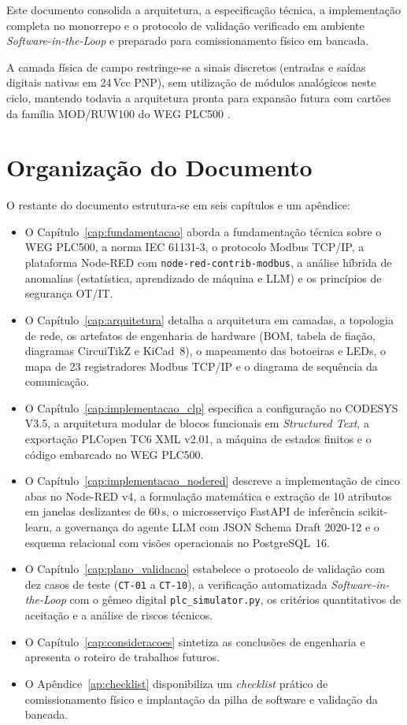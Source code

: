 Este documento consolida a arquitetura, a especificação técnica, a implementação completa no monorrepo e o protocolo de validação verificado em ambiente \textit{Software-in-the-Loop} e preparado para comissionamento físico em bancada.

A camada física de campo restringe-se a sinais discretos (entradas e saídas digitais nativas em 24\,Vcc PNP), sem utilização de módulos analógicos neste ciclo, mantendo todavia a arquitetura pronta para expansão futura com cartões da família MOD/RUW100 do WEG PLC500 \cite{weg_plc500_manual}.

\section{Organização do Documento}
\label{sec:organizacao}

O restante do documento estrutura-se em seis capítulos e um apêndice:
\begin{itemize}
  \item O Capítulo~\ref{cap:fundamentacao} aborda a fundamentação técnica sobre o WEG PLC500, a norma IEC 61131-3, o protocolo Modbus TCP/IP, a plataforma Node-RED com \texttt{node-red-contrib-modbus}, a análise híbrida de anomalias (estatística, aprendizado de máquina e LLM) e os princípios de segurança OT/IT.
  \item O Capítulo~\ref{cap:arquitetura} detalha a arquitetura em camadas, a topologia de rede, os artefatos de engenharia de hardware (BOM, tabela de fiação, diagramas CircuiTikZ e KiCad~8), o mapeamento das botoeiras e LEDs, o mapa de 23 registradores Modbus TCP/IP e o diagrama de sequência da comunicação.
  \item O Capítulo~\ref{cap:implementacao_clp} especifica a configuração no CODESYS V3.5, a arquitetura modular de blocos funcionais em \textit{Structured Text}, a exportação PLCopen TC6 XML v2.01, a máquina de estados finitos e o código embarcado no WEG PLC500.
  \item O Capítulo~\ref{cap:implementacao_nodered} descreve a implementação de cinco abas no Node-RED v4, a formulação matemática e extração de 10 atributos em janelas deslizantes de $60\,\text{s}$, o microsserviço FastAPI de inferência scikit-learn, a governança do agente LLM com JSON Schema Draft 2020-12 e o esquema relacional com visões operacionais no PostgreSQL~16.
  \item O Capítulo~\ref{cap:plano_validacao} estabelece o protocolo de validação com dez casos de teste (\texttt{CT-01} a \texttt{CT-10}), a verificação automatizada \textit{Software-in-the-Loop} com o gêmeo digital \texttt{plc\_simulator.py}, os critérios quantitativos de aceitação e a análise de riscos técnicos.
  \item O Capítulo~\ref{cap:consideracoes} sintetiza as conclusões de engenharia e apresenta o roteiro de trabalhos futuros.
  \item O Apêndice~\ref{ap:checklist} disponibiliza um \textit{checklist} prático de comissionamento físico e implantação da pilha de software e validação da bancada.
\end{itemize}
